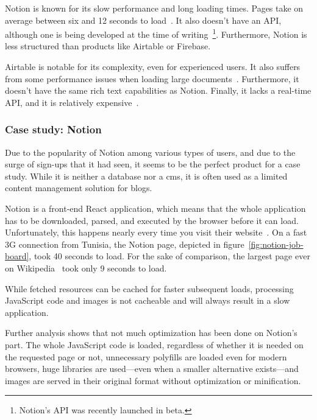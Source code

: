 Notion is known for its slow performance and long loading times.
Pages take on average between six and 12 seconds to load~\autocite{akulov_case_2020}.
It also doesn't have an API, although one is being developed at the time of writing~\footnote{Notion's API was recently launched in beta.}.
Furthermore, Notion is less structured than products like Airtable or Firebase.

Airtable is notable for its complexity, even for experienced users.
It also suffers from some performance issues when loading large documents~\autocite{noauthor_airtable_nodate}.
Furthermore, it doesn't have the same rich text capabilities as Notion.
Finally, it lacks a real-time API, and it is relatively expensive~\autocite{noauthor_airtable_nodate}.

\subsubsection{Case study: Notion}

Due to the popularity of Notion among various types of users, and due to the surge of sign-ups that it had seen, it seems to be the perfect product for a case study.
While it is neither a database nor a \acrshort{cms}, it is often used as a limited content management solution for blogs.

Notion is a front-end React application, which means that the whole application has to be downloaded, parsed, and executed by the browser before it can load.
Unfortunately, this happens nearly every time you visit their website~\autocite{akulov_case_2020}.
On a fast 3G connection from Tunisia, the Notion page, depicted in figure~\ref{fig:notion-job-board}, took 40 seconds to load. For the sake of comparison, the largest page ever on Wikipedia~\autocite{noauthor_long_nodate} took only 9 seconds to load.


While fetched resources can be cached for faster subsequent loads, processing JavaScript code and images is not \gls{cacheable} and will always result in a slow application.

Further analysis shows that not much optimization has been done on Notion's part.
The whole JavaScript code is loaded, regardless of whether it is needed on the requested page or not, unnecessary \gls{polyfill}s are loaded even for modern browsers, huge libraries are used---even when a smaller alternative exists---and images are served in their original format without optimization or minification.

